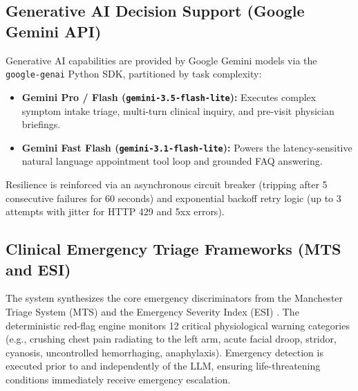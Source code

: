 \documentclass[conference]{IEEEtran}
\begin{document}
\subsection{Generative AI Decision Support (Google Gemini API)}
Generative AI capabilities are provided by Google Gemini models via the \texttt{google-genai} Python SDK, partitioned by task complexity:
\begin{itemize}
    \item \textbf{Gemini Pro / Flash (\texttt{gemini-3.5-flash-lite}):} Executes complex symptom intake triage, multi-turn clinical inquiry, and pre-visit physician briefings.
    \item \textbf{Gemini Fast Flash (\texttt{gemini-3.1-flash-lite}):} Powers the latency-sensitive natural language appointment tool loop and grounded FAQ answering.
\end{itemize}
Resilience is reinforced via an asynchronous circuit breaker (tripping after 5 consecutive failures for 60 seconds) and exponential backoff retry logic (up to 3 attempts with jitter for HTTP 429 and 5xx errors).

\subsection{Clinical Emergency Triage Frameworks (MTS and ESI)}
The system synthesizes the core emergency discriminators from the Manchester Triage System (MTS) \cite{mackway2014emergency} and the Emergency Severity Index (ESI) \cite{gilboy2020emergency}. The deterministic red-flag engine monitors 12 critical physiological warning categories (e.g., crushing chest pain radiating to the left arm, acute facial droop, stridor, cyanosis, uncontrolled hemorrhaging, anaphylaxis). Emergency detection is executed prior to and independently of the LLM, ensuring life-threatening conditions immediately receive emergency escalation.
\end{document}
